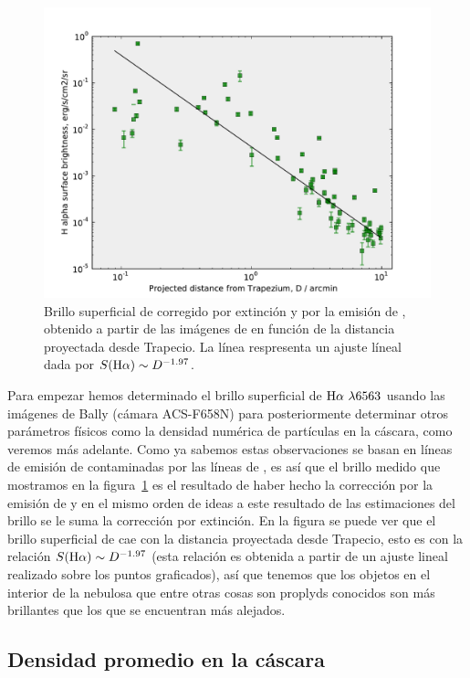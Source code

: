 \begin{figure}
  \centering
   \includegraphics[width=.95\linewidth, clip]{luis-programas/brightness-shell_acs_Vs-D_new.pdf}
  \caption{Brillo superficial de \ha{}  corregido por extinción y por la emisión de \nii{}, obtenido a partir de las imágenes de \citeauthor{Bally:2006a} en función de la distancia proyectada desde Trapecio. La línea respresenta un ajuste líneal dada por \(S(\mathrm{H}\alpha{})\sim D^{-1.97}\).} 
  \label{fig:bright}
\end{figure}


Para empezar hemos determinado el brillo superficial de \(\mathrm{H}\alpha{}~\lambda6563\) usando las imágenes de Bally (cámara ACS-F658N) para posteriormente determinar otros parámetros físicos como la densidad numérica de partículas en la cáscara, como veremos más adelante. Como ya sabemos estas observaciones se basan en líneas de emisión de \ha{} contaminadas por las líneas de \nii{}, es así que el brillo medido que  mostramos en la figura~\ref{fig:bright} es el resultado de haber hecho la corrección por la emisión de \nii{} y en el mismo orden de ideas a este resultado de las estimaciones del brillo se le suma la corrección por extinción. En la figura se puede ver que el brillo superficial  de \ha{} cae con la distancia proyectada desde Trapecio, esto es con la relación \(S(\mathrm{H}\alpha{})\sim D^{-1.97}\) (esta relación es obtenida a partir de un ajuste lineal realizado sobre los  puntos graficados), así que tenemos que los objetos en el interior de la nebulosa que entre otras cosas son proplyds conocidos son más brillantes que los que se encuentran más alejados. 

\subsection{Densidad promedio en la cáscara}
\label{sec:density}

